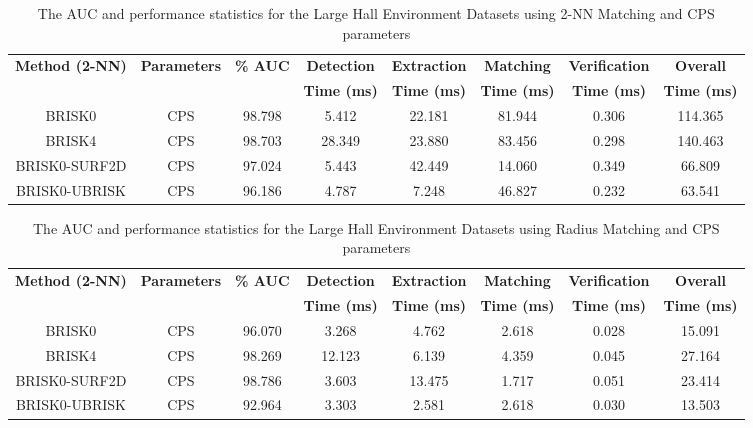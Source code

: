 \begin{table}
\centering
\caption{The AUC and performance statistics for the Large Hall Environment
Datasets using 2-NN Matching and CPS parameters}
\begin{tabular}{|c|c|c|c|c|c|c|c|}
\hline 
\textbf{Method (2-NN)} & \textbf{Parameters} & \textbf{\% AUC} & \textbf{Detection} & \textbf{Extraction} & \textbf{Matching} & \textbf{Verification} & \textbf{Overall}\tabularnewline
 &  &  & \textbf{Time (ms)} & \textbf{Time (ms)} & \textbf{Time (ms)} & \textbf{Time (ms)} & \textbf{Time (ms)}\tabularnewline
\hline 
\hline 
BRISK0 & CPS & 98.798 & 5.412 & 22.181 & 81.944 & 0.306 & 114.365\tabularnewline
\hline 
BRISK4 & CPS & 98.703 & 28.349 & 23.880 & 83.456 & 0.298 & 140.463\tabularnewline
\hline 
BRISK0-SURF2D & CPS & 97.024 & 5.443 & 42.449 & 14.060 & 0.349 & 66.809\tabularnewline
\hline 
BRISK0-UBRISK & CPS & 96.186 & 4.787 & 7.248 & 46.827 & 0.232 & 63.541\tabularnewline
\hline 
\end{tabular}
\label{app:lh_hamming}
\end{table}


\begin{table}
\centering
\caption{The AUC and performance statistics for the Large Hall Environment
Datasets using Radius Matching and CPS parameters}
\begin{tabular}{|c|c|c|c|c|c|c|c|}
\hline 
\textbf{Method (2-NN)} & \textbf{Parameters} & \textbf{\% AUC} & \textbf{Detection} & \textbf{Extraction} & \textbf{Matching} & \textbf{Verification} & \textbf{Overall}\tabularnewline
 &  &  & \textbf{Time (ms)} & \textbf{Time (ms)} & \textbf{Time (ms)} & \textbf{Time (ms)} & \textbf{Time (ms)}\tabularnewline
\hline 
\hline 
BRISK0 & CPS & 96.070 & 3.268 & 4.762 & 2.618 & 0.028 & 15.091\tabularnewline
\hline 
BRISK4 & CPS & 98.269 & 12.123 & 6.139 & 4.359 & 0.045 & 27.164\tabularnewline
\hline 
BRISK0-SURF2D & CPS & 98.786 & 3.603 & 13.475 & 1.717 & 0.051 & 23.414\tabularnewline
\hline 
BRISK0-UBRISK & CPS & 92.964 & 3.303 & 2.581 & 2.618 & 0.030 & 13.503\tabularnewline
\hline 
\end{tabular}
\label{app:lh_hamming}
\end{table}



